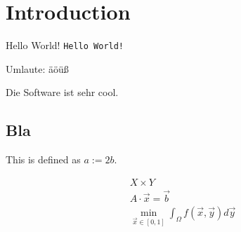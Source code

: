 
\chapter{Introduction}

\cite{zenger91sparse}

Hello World! \texttt{Hello World!}

Umlaute: äöüß

Die Software \sgpp ist sehr cool.

\section{Bla}

This is defined as $a := 2b$.

\begin{gather}
  X \times Y\\
  A \cdot \vec{x} = \vec{b}\\
  \min_{\vec{x} \in [0, 1]} \int_\Omega f(\vec{x}, \vec{y}) d\vec{y}
\end{gather}

\blindmathpaper
